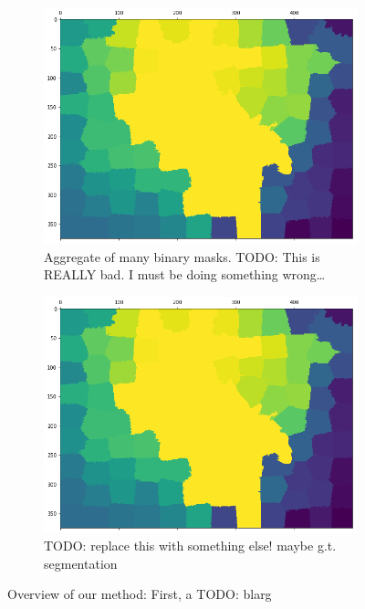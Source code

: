 \documentclass[twocolumn]{article}
\newcommand{\todo}[1]{}
\renewcommand{\todo}[1]{{\color{red} TODO: {#1}}}
\newcommand{\figlab}[1]{\label{fig:#1}}
\begin{document}
\begin{figure}[t]
\begin{subfigure}{0.49\linewidth}
    \includegraphics[width=\linewidth]{figs/aggregate.png}
    \caption{Aggregate of many binary masks. \todo{This is REALLY bad. I must be doing something wrong\ldots}}
  \end{subfigure}
  \begin{subfigure}{0.49\linewidth}
    \includegraphics[width=\linewidth]{figs/aggregate.png}
    \caption{\todo{replace this with something else! maybe g.t. segmentation}}
  \end{subfigure}

  \caption{
    Overview of our method: First, a \todo{blarg}
  }
  \figlab{process}

\end{figure}
\end{document}
